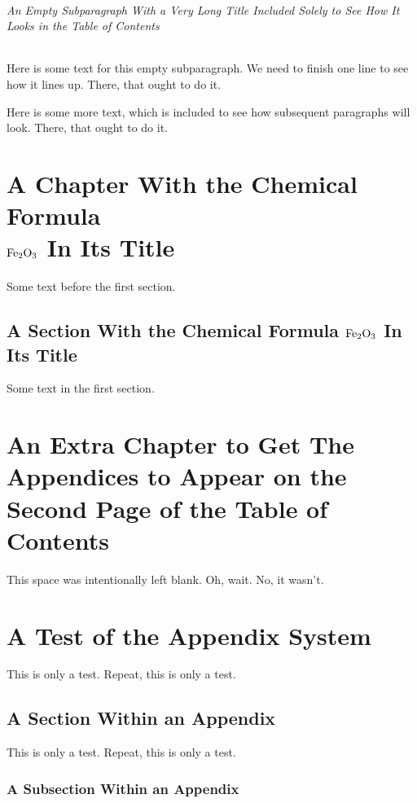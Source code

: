 \documentclass[phd, 12pt, print]{fauthesis}
\begin{document}
\subparagraph{An Empty Subparagraph With a Very Long Title Included Solely to See How It Looks in the Table of Contents}

Here is some text for this empty subparagraph.  We need to finish one line to see how it lines up.  There, that ought to do it.

Here is some more text, which is included to see how subsequent paragraphs will look.  There, that ought to do it.


\chapter{A Chapter With the Chemical Formula%
	\texorpdfstring{\\ $\rm Fe_2 O_3$}{Fe2O3} In Its Title}

Some text before the first section.

\section{A Section With the Chemical Formula 	\texorpdfstring{$\rm Fe_2 O_3$}{Fe2O3} In Its Title}

Some text in the first section.


\chapter{An Extra Chapter to Get The Appendices to Appear on the Second Page of the Table of Contents}

This space was intentionally left blank.  Oh, wait.  No, it wasn't.



\backmatter


\chapter{A Test of the Appendix System}

This is only a test.  Repeat, this is only a test.

\section{A Section Within an Appendix}

This is only a test.  Repeat, this is only a test.

\subsection{A Subsection Within an Appendix}
\end{document}
